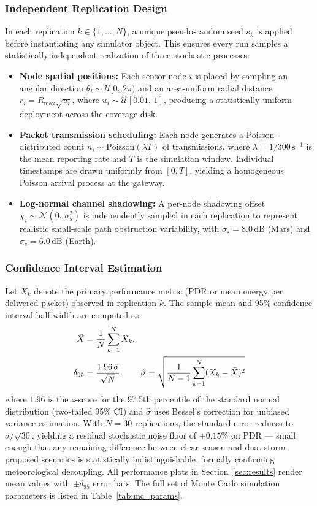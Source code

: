 \documentclass[journal,10pt,doublecolumn]{IEEEtran}
\begin{document}
\subsubsection{Independent Replication Design}
In each replication $k \in \{1, \ldots, N\}$, a unique pseudo-random seed $s_k$ is applied before instantiating any simulator object. This ensures every run samples a statistically independent realization of three stochastic processes:
\begin{itemize}
    \item \textbf{Node spatial positions:} Each sensor node $i$ is placed by sampling an angular direction $\theta_i \sim \mathcal{U}[0,\,2\pi)$ and an area-uniform radial distance $r_i = R_{\max}\sqrt{u_i}$, where $u_i \sim \mathcal{U}[0.01,\,1]$, producing a statistically uniform deployment across the coverage disk.
    \item \textbf{Packet transmission scheduling:} Each node generates a Poisson-distributed count $n_i \sim \text{Poisson}(\lambda T)$ of transmissions, where $\lambda = 1/300\,\text{s}^{-1}$ is the mean reporting rate and $T$ is the simulation window. Individual timestamps are drawn uniformly from $[0, T]$, yielding a homogeneous Poisson arrival process at the gateway.
    \item \textbf{Log-normal channel shadowing:} A per-node shadowing offset $\chi_i \sim \mathcal{N}(0,\,\sigma_s^2)$ is independently sampled in each replication to represent realistic small-scale path obstruction variability, with $\sigma_s = 8.0\,\text{dB}$ (Mars) and $\sigma_s = 6.0\,\text{dB}$ (Earth).
\end{itemize}

\subsubsection{Confidence Interval Estimation}
Let $X_k$ denote the primary performance metric (PDR or mean energy per delivered packet) observed in replication $k$. The sample mean and 95\% confidence interval half-width are computed as:
\begin{align}
    \bar{X} &= \frac{1}{N}\sum_{k=1}^{N} X_k, \notag \\
    \delta_{95} &= \frac{1.96\,\hat{\sigma}}{\sqrt{N}}, \qquad
    \hat{\sigma} = \sqrt{\frac{1}{N-1}\sum_{k=1}^{N}(X_k - \bar{X})^2}
\label{eq:ci}
\end{align}
where $1.96$ is the $z$-score for the 97.5th percentile of the standard normal distribution (two-tailed 95\% CI) and $\hat{\sigma}$ uses Bessel's correction for unbiased variance estimation. With $N=30$ replications, the standard error reduces to $\hat{\sigma}/\sqrt{30}$, yielding a residual stochastic noise floor of $\pm 0.15\%$ on PDR --- small enough that any remaining difference between clear-season and dust-storm proposed scenarios is statistically indistinguishable, formally confirming meteorological decoupling. All performance plots in Section~\ref{sec:results} render mean values with $\pm\delta_{95}$ error bars. The full set of Monte Carlo simulation parameters is listed in Table~\ref{tab:mc_params}.
\end{document}

